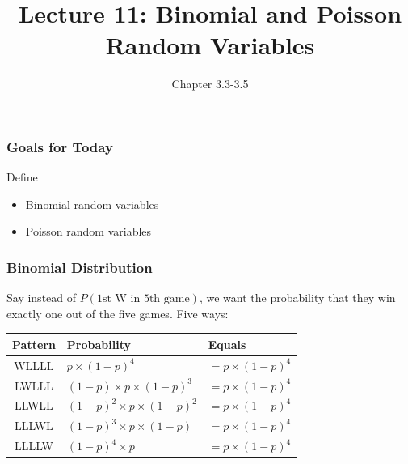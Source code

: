 \documentclass[handout]{beamer}
\title{Lecture 11: Binomial and Poisson Random Variables}
\author{Chapter 3.3-3.5}
\date{}
\newcommand{\blue}[1]{\textcolor{blue2}{#1}}
\begin{document}
\begin{frame}
\titlepage
\end{frame}


\begin{frame}[fragile]
\frametitle{Goals for Today}

Define
\begin{itemize}
\item Binomial random variables
\item Poisson random variables
\end{itemize}


\end{frame}


\begin{frame}
\frametitle{Binomial Distribution}

Say instead of $P(\mbox{1st W in 5th game})$, we want the probability that they win \blue{exactly one} out of the five games.  Five ways:

\pause\begin{center}
\begin{tabular}{c|ll}
Pattern & Probability & Equals\\
\hline
\blue{WLLLL} & $p \times (1-p)^4$ & $=p\times(1-p)^4$\\
\blue{LWLLL} & $(1-p) \times p \times (1-p)^3$ & $=p\times(1-p)^4$\\
\blue{LLWLL} & $(1-p)^2 \times p \times (1-p)^2$& $=p\times(1-p)^4$\\
\blue{LLLWL} & $(1-p)^3 \times p \times (1-p)$& $=p\times(1-p)^4$\\
\blue{LLLLW} & $(1-p)^4 \times p$& $=p\times(1-p)^4$\\
\end{tabular} 
\end{center}


\end{frame}
\end{document}
